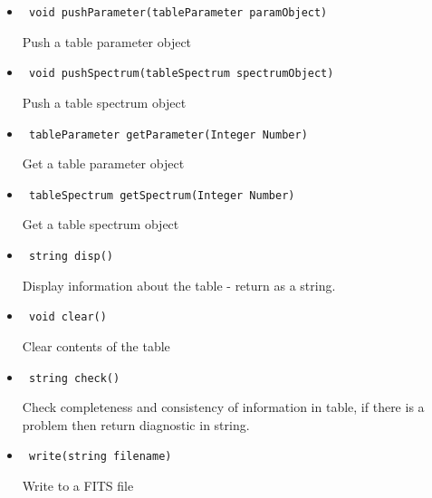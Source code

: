 \documentclass[11pt]{book}
\begin{document}
\begin{itemize}

\item    \begin{verbatim} void pushParameter(tableParameter paramObject) \end{verbatim}
            
            Push a table parameter object

\item    \begin{verbatim} void pushSpectrum(tableSpectrum spectrumObject) \end{verbatim}
            
            Push a table spectrum object

\item    \begin{verbatim} tableParameter getParameter(Integer Number) \end{verbatim}
            
            Get a table parameter object

\item    \begin{verbatim} tableSpectrum getSpectrum(Integer Number) \end{verbatim}
            
            Get a table spectrum object

\item    \begin{verbatim} string disp() \end{verbatim}

            Display information about the table - return as a string.

\item    \begin{verbatim} void clear() \end{verbatim}

            Clear contents of the table

\item    \begin{verbatim} string check() \end{verbatim}

            Check completeness and consistency of information in table,
            if there is a problem then return diagnostic in string.

\item    \begin{verbatim} write(string filename) \end{verbatim}

            Write to a FITS file

\end{itemize}
\end{document}
